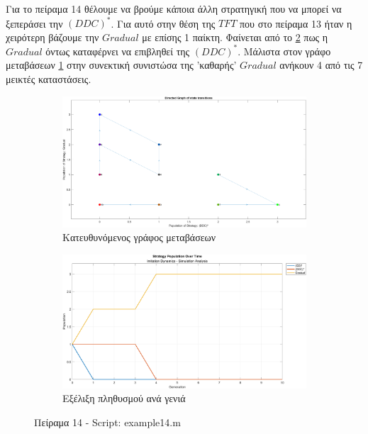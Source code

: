 \documentclass[12pt]{report}
\begin{document}
Για το πείραμα 14 θέλουμε να βρούμε κάποια άλλη στρατηγική που να μπορεί να ξεπεράσει την $(DDC)^*$. Για αυτό στην θέση της $TFT$ που στο πείραμα 13 ήταν η χειρότερη βάζουμε την $Gradual$ με επίσης 1 παίκτη. Φαίνεται από το \ref{fig:fig14-sim} πως η $Gradual$ όντως καταφέρνει να επιβληθεί της $(DDC)^*$. Μάλιστα στον γράφο μεταβάσεων \ref{fig:fig14} στην συνεκτική συνιστώσα της 'καθαρής' $Gradual$ ανήκουν 4 από τις 7 μεικτές καταστάσεις.
\begin{figure}[H]
    \centering

    \begin{subfigure}[b]{0.45\textwidth}
        \includegraphics[width=\linewidth]{Figures Imitation Dynamics/example14.png}
        \caption{Κατευθυνόμενος γράφος μεταβάσεων}
        \label{fig:fig14}
    \end{subfigure}
    \hfill
    \begin{subfigure}[b]{0.45\textwidth}
        \includegraphics[width=\linewidth]{Figures Imitation Dynamics/example14-sim.png}
        \caption{Εξέλιξη πληθυσμού ανά γενιά}
        \label{fig:fig14-sim}
    \end{subfigure}

    \caption{Πείραμα 14 - \foreignlanguage{english}{Script: example14.m}}
    \label{fig:example14}
\end{figure}
\end{document}
